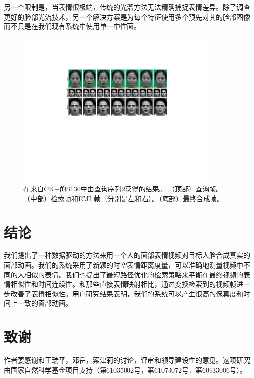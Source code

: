 另一个限制是，当表情很极端，传统的光溜方法无法精确捕捉表情差异。除了调查更好的脸部光流技术，另一个解决方案是为每个特征使用多个预先对其的脸部图像而不只是在我们现有系统中使用单一中性面。

\begin{figure}[htbp]
\centering
    \includegraphics[width=0.90\textwidth]{data/img/liwen2S130.pdf}
    \caption{在来自CK+的S130中由查询序列2获得的结果。 （顶部）查询帧。（中部）检索帧和EMI 帧（分别是左和右）。（底部）最终合成帧。}
    \label{fig:result3}
\end{figure}

\section{结论}

我们提出了一种数据驱动的方法来用一个人的面部表情视频对目标人脸合成真实的面部动画。我们的系统采用了新颖的时空表情距离度量，可以准确地测量视频中不同的人相似的表情。我们也提出了最短路径优化的检索策略来平衡在最终视频的表情相似性和时间连续性。和那些直接表情映射相比，通过变换检索到的视频帧进一步改善了表情相似性。用户研究结果表明，我们的系统可以产生很高的保真度和时间上一致的面部动画。

\section*{致谢}
作者要感谢和王瑞平，邓岳，索津莉的讨论，评审和领导建设性的意见。这项研究由国家自然科学基金项目支持（第61035002号，第61073072号，第60933006号）。

\setcounter{NAT@ctr}{0}%
\renewcommand{\refname} {参考文献}
{\small

\pagestyle{empty}

}
